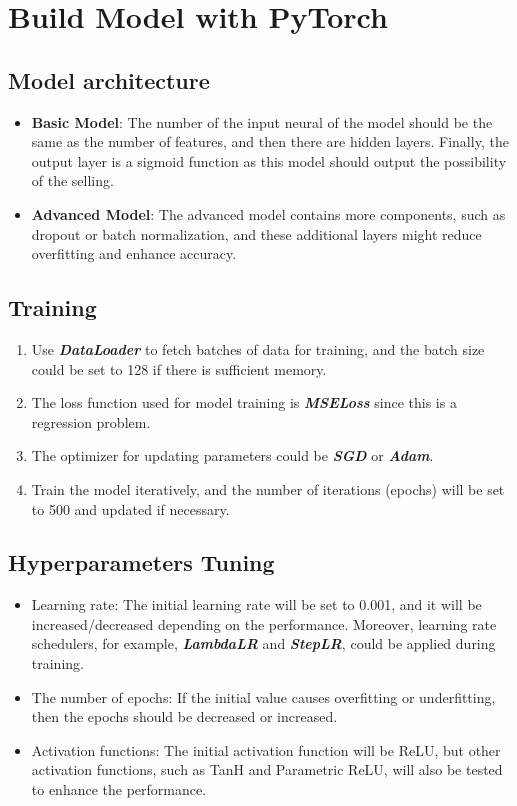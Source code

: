 \documentclass[12pt,twoside]{report}
\begin{document}
\section{Build Model with PyTorch}
\subsection{Model architecture}
\begin{itemize}
	\item \textbf{Basic Model}: The number of the input neural of the model should be the same as the number of features, and then there are hidden layers. Finally, the output layer is a sigmoid function as this model should output the possibility of the selling. 
	\item \textbf{Advanced Model}: The advanced model contains more components, such as dropout or batch normalization, and these additional layers might reduce overfitting and enhance accuracy. 
\end{itemize}

\subsection{Training}
\begin{enumerate}
	\item Use \textbf{\textit{DataLoader}} to fetch batches of data for training, and the batch  size could be set to 128 if there is sufficient memory. 
	\item The loss function used for model training is \textbf{\textit{MSELoss}} since this is a regression problem. 
	\item The optimizer for updating parameters could be \textbf{\textit{SGD}} or \textbf{\textit{Adam}}.
	\item Train the model iteratively, and the number of iterations (epochs) will be set to 500 and updated if necessary. 
\end{enumerate}

\subsection{Hyperparameters Tuning}
\begin{itemize}
	\item Learning rate: The initial learning rate will be set to 0.001, and it will be increased/decreased depending on the performance. Moreover, learning rate schedulers, for example, \textbf{\textit{LambdaLR}} and \textbf{\textit{StepLR}}, could be applied during training. 
	\item The number of epochs: If the initial value causes overfitting or underfitting, then the epochs should be decreased or increased. 
	\item Activation functions: The initial activation function will be ReLU, but other activation functions, such as TanH and Parametric ReLU, will also be tested to enhance the performance. 
\end{itemize}
\end{document}
